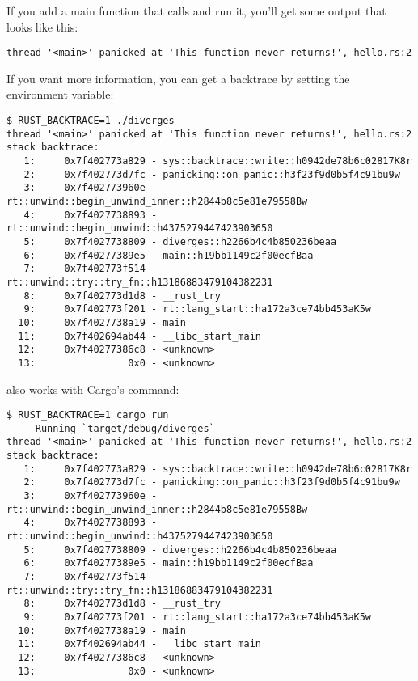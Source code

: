 \blank

If you add a main function that calls  and run it, you'll get some output that looks like this:

\begin{verbatim}
thread '<main>' panicked at 'This function never returns!', hello.rs:2
\end{verbatim}

If you want more information, you can get a backtrace by setting the  environment variable:

\begin{verbatim}
$ RUST_BACKTRACE=1 ./diverges
thread '<main>' panicked at 'This function never returns!', hello.rs:2
stack backtrace:
   1:     0x7f402773a829 - sys::backtrace::write::h0942de78b6c02817K8r
   2:     0x7f402773d7fc - panicking::on_panic::h3f23f9d0b5f4c91bu9w
   3:     0x7f402773960e - rt::unwind::begin_unwind_inner::h2844b8c5e81e79558Bw
   4:     0x7f4027738893 - rt::unwind::begin_unwind::h4375279447423903650
   5:     0x7f4027738809 - diverges::h2266b4c4b850236beaa
   6:     0x7f40277389e5 - main::h19bb1149c2f00ecfBaa
   7:     0x7f402773f514 - rt::unwind::try::try_fn::h13186883479104382231
   8:     0x7f402773d1d8 - __rust_try
   9:     0x7f402773f201 - rt::lang_start::ha172a3ce74bb453aK5w
  10:     0x7f4027738a19 - main
  11:     0x7f402694ab44 - __libc_start_main
  12:     0x7f40277386c8 - <unknown>
  13:                0x0 - <unknown>
\end{verbatim}

 also works with Cargo's  command:

\begin{verbatim}
$ RUST_BACKTRACE=1 cargo run
     Running `target/debug/diverges`
thread '<main>' panicked at 'This function never returns!', hello.rs:2
stack backtrace:
   1:     0x7f402773a829 - sys::backtrace::write::h0942de78b6c02817K8r
   2:     0x7f402773d7fc - panicking::on_panic::h3f23f9d0b5f4c91bu9w
   3:     0x7f402773960e - rt::unwind::begin_unwind_inner::h2844b8c5e81e79558Bw
   4:     0x7f4027738893 - rt::unwind::begin_unwind::h4375279447423903650
   5:     0x7f4027738809 - diverges::h2266b4c4b850236beaa
   6:     0x7f40277389e5 - main::h19bb1149c2f00ecfBaa
   7:     0x7f402773f514 - rt::unwind::try::try_fn::h13186883479104382231
   8:     0x7f402773d1d8 - __rust_try
   9:     0x7f402773f201 - rt::lang_start::ha172a3ce74bb453aK5w
  10:     0x7f4027738a19 - main
  11:     0x7f402694ab44 - __libc_start_main
  12:     0x7f40277386c8 - <unknown>
  13:                0x0 - <unknown>
\end{verbatim}

